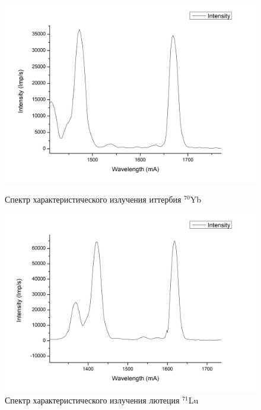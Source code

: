 \documentclass[a4paper]{article}
\begin{document}
\begin{enumerate}
    \begin{figure}[h]
\begin{center}
\begin{minipage}[h]{0.45\linewidth}
\includegraphics[width=1\linewidth]{Yb.png}
\caption{Спектр характеристического излучения иттербия $^{70}$Yb} %
\end{minipage}
\hfill 
\begin{minipage}[h]{0.45\linewidth}
\includegraphics[width=1\linewidth]{Lu.png}
\caption{Спектр характеристического излучения лютеция $^{71}$Lu}
\label{ris:experimcoded}
\end{minipage}
\end{center}
\end{figure}


\end{enumerate}
\end{document}
